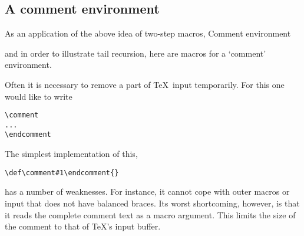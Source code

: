 \documentclass[letterpaper]{book}
\begin{document}
\subsection{A comment environment}

As an application of the above idea of two-step macros,
\howto Comment environment\par
and in order to illustrate tail recursion, here are 
macros for a `comment' environment.

Often it is necessary to remove a part of \TeX\
input temporarily. For this one would like to
write
\begin{verbatim}
\comment
...
\endcomment
\end{verbatim}
The simplest implementation of this, 
\begin{verbatim}
\def\comment#1\endcomment{}
\end{verbatim} 
has a number of weaknesses. For instance,
it cannot cope with outer macros or input that 
does not have balanced braces. Its worst
shortcoming, however, is that it reads the complete
comment text as a macro argument. This limits the size
of the comment to that of \TeX's input buffer.
\end{document}
